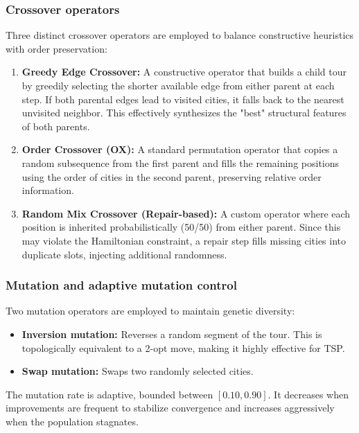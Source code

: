 \documentclass[11pt,a4paper]{article}
\begin{document}
\subsubsection*{Crossover operators}
Three distinct crossover operators are employed to balance constructive heuristics with order preservation:
\begin{enumerate}[nosep]
  \item \textbf{Greedy Edge Crossover:} A constructive operator that builds a child tour by greedily selecting the shorter available edge from either parent at each step. If both parental edges lead to visited cities, it falls back to the nearest unvisited neighbor. This effectively synthesizes the "best" structural features of both parents.
  \item \textbf{Order Crossover (OX):} A standard permutation operator that copies a random subsequence from the first parent and fills the remaining positions using the order of cities in the second parent, preserving relative order information.
  \item \textbf{Random Mix Crossover (Repair-based):} A custom operator where each position is inherited probabilistically (50/50) from either parent. Since this may violate the Hamiltonian constraint, a repair step fills missing cities into duplicate slots, injecting additional randomness.
\end{enumerate}

\subsubsection*{Mutation and adaptive mutation control}
Two mutation operators are employed to maintain genetic diversity:
\begin{itemize}[nosep]
  \item \textbf{Inversion mutation:} Reverses a random segment of the tour. This is topologically equivalent to a 2-opt move, making it highly effective for TSP.
  \item \textbf{Swap mutation:} Swaps two randomly selected cities.
\end{itemize}
The mutation rate is adaptive, bounded between $[0.10, 0.90]$. It decreases when improvements are frequent to stabilize convergence and increases aggressively when the population stagnates.
\end{document}
